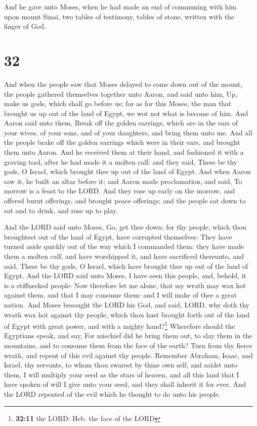  And he gave unto Moses, when he had made an end of
communing with him upon mount Sinai, two tables of testimony, tables of
stone, written with the finger of God.

\hypertarget{section-31}{%
\section{32}\label{section-31}}

 And when the people saw that Moses delayed to come down
out of the mount, the people gathered themselves together unto Aaron,
and said unto him, Up, make us gods, which shall go before us; for as
for this Moses, the man that brought us up out of the land of Egypt, we
wot not what is become of him.  And Aaron said unto them,
Break off the golden earrings, which are in the ears of your wives, of
your sons, and of your daughters, and bring them unto me. 
And all the people brake off the golden earrings which were in their
ears, and brought them unto Aaron.  And he received them
at their hand, and fashioned it with a graving tool, after he had made
it a molten calf: and they said, These be thy gods, O Israel, which
brought thee up out of the land of Egypt.  And when Aaron
saw it, he built an altar before it; and Aaron made proclamation, and
said, To morrow is a feast to the LORD.  And they rose up
early on the morrow, and offered burnt offerings, and brought peace
offerings; and the people sat down to eat and to drink, and rose up to
play.

 And the LORD said unto Moses, Go, get thee down; for thy
people, which thou broughtest out of the land of Egypt, have corrupted
themselves:  They have turned aside quickly out of the way
which I commanded them: they have made them a molten calf, and have
worshipped it, and have sacrificed thereunto, and said, These be thy
gods, O Israel, which have brought thee up out of the land of Egypt.
 And the LORD said unto Moses, I have seen this people,
and, behold, it is a stiffnecked people:  Now therefore
let me alone, that my wrath may wax hot against them, and that I may
consume them: and I will make of thee a great nation. 
And Moses besought the LORD his God, and said, LORD, why doth thy wrath
wax hot against thy people, which thou hast brought forth out of the
land of Egypt with great power, and with a mighty hand?\footnote{\textbf{32:11}
  the LORD: Heb. the face of the LORD}  Wherefore should
the Egyptians speak, and say, For mischief did he bring them out, to
slay them in the mountains, and to consume them from the face of the
earth? Turn from thy fierce wrath, and repent of this evil against thy
people.  Remember Abraham, Isaac, and Israel, thy
servants, to whom thou swarest by thine own self, and saidst unto them,
I will multiply your seed as the stars of heaven, and all this land that
I have spoken of will I give unto your seed, and they shall inherit it
for ever.  And the LORD repented of the evil which he
thought to do unto his people.

